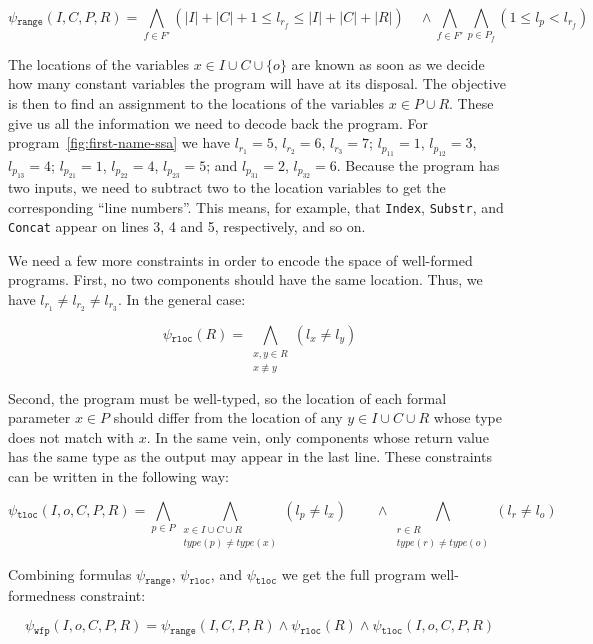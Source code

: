\[
  \psi{}_{\mathtt{range}}(I, C, P, R) =
  \bigwedge_{f \in F'} (|I| + |C| + 1 \leq l_{r_f} \leq |I| + |C| + |R|)
  \quad \wedge
  \bigwedge_{f \in F'}
  \bigwedge_{p \in P_f} (1 \leq l_p < l_{r_f})
\]

The locations of the variables $x \in I \cup C \cup \{o\}$ are known as soon as
we decide how many constant variables the program will have at its disposal. The
objective is then to find an assignment to the locations of the variables $x \in
P \cup R$. These give us all the information we need to decode back the program.
For program~\ref{fig:first-name-ssa} we have
$l_{r_1} = 5$, $l_{r_2} = 6$, $l_{r_3} = 7$; $l_{p_{11}} = 1$, $l_{p_{12}} = 3$,
$l_{p_{13}} = 4$; $l_{p_{21}} = 1$, $l_{p_{22}} = 4$, $l_{p_{23}} = 5$; and
$l_{p_{31}} = 2$, $l_{p_{32}} = 6$. Because the program has two inputs, we need
to subtract two to the location variables to get the corresponding ``line
numbers''. This means, for example, that \lstinline{Index}, \lstinline{Substr},
and \lstinline{Concat} appear on lines 3, 4 and 5, respectively, and so on.

We need a few more constraints in order to encode the space of well-formed
programs. First, no two components should have the same location. Thus,
we have $l_{r_1} \neq l_{r_2} \neq l_{r_3}$. In the general case:

\[
  \psi{}_{\mathtt{rloc}}(R) =
  \bigwedge_{\substack{x, y \in R\\ x \not\equiv y}} (l_{x} \neq l_{y}) 
\]

\noindent
Second, the program must be well-typed, so the location of each formal parameter
$x \in P$ should differ from the location of any $y \in I \cup C \cup R$ whose
type does not match with $x$. In the same vein, only components whose return
value has the same type as the output may appear in the last line. These
constraints can be written in the following way:

\[
  \psi{}_{\mathtt{tloc}}(I, o, C, P, R) =
  \bigwedge_{p \in P}
  \bigwedge_{\substack{x \in I \cup C \cup R \\ type(p) \neq type(x)}}
  (l_p \neq l_x)
  \qquad \wedge
  \bigwedge_{\substack{r \in R \\ type(r) \neq type(o)}}
  (l_r \neq l_o)
\]

Combining formulas $\psi{}_{\mathtt{range}}$, $\psi{}_{\mathtt{rloc}}$, and
$\psi{}_{\mathtt{tloc}}$ we get the full program well-formedness constraint:

\[
  \psi{}_{\mathtt{wfp}}(I, o, C, P, R) =
  \psi{}_{\mathtt{range}}(I, C, P, R)
  \wedge \psi{}_{\mathtt{rloc}}(R)
  \wedge \psi{}_{\mathtt{tloc}}(I, o, C, P, R)
\]


